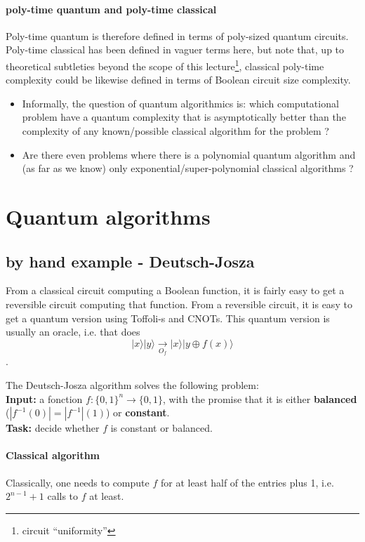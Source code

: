\documentclass{article}
\begin{document}
\paragraph{poly-time quantum and poly-time classical} Poly-time quantum is therefore
defined in terms of poly-sized quantum circuits. Poly-time classical
has been defined in vaguer terms here, but note that, up to theoretical
subtleties beyond the scope of this lecture\footnote{circuit ``uniformity''
}, classical poly-time complexity could be likewise defined in terms
of Boolean circuit size complexity.

\begin{itemize}
\item Informally, the question of quantum algorithmics is: which computational problem
have a quantum complexity that is asymptotically better than the complexity
of any known/possible classical algorithm for the problem ?
\item Are there even problems where there is a polynomial quantum algorithm and (as far as we
know) only exponential/super-polynomial classical algorithms ?
\end{itemize}

\section{Quantum algorithms}

\subsection{by hand example - Deutsch-Josza}

From a classical circuit computing a Boolean function, it is fairly easy to get a reversible 
circuit computing that function. From a reversible circuit, it is easy to get a quantum 
version using Toffoli-s and CNOTs. This quantum version is usually an oracle, i.e. that does
$$|x\rangle|y\rangle\xrightarrow[O_f]{}|x\rangle|y\oplus f(x)\rangle$$.

The Deutsch-Josza algorithm solves the following problem:\\
\textbf{Input:} a fonction $f:\{0,1\}^{n}\rightarrow \{0,1\}$,
with the promise that it is either \textbf{balanced} ($|f^{-1}(0)|=|f^{-1}|(1)$) or
\textbf{constant}.\\
\textbf{Task:} decide whether $f$ is constant or balanced.

\paragraph{Classical algorithm} Classically, one needs to compute $f$ for at least
half of the entries plus 1, i.e. $2^{n-1}+1$ calls to $f$ at least.
\end{document}
